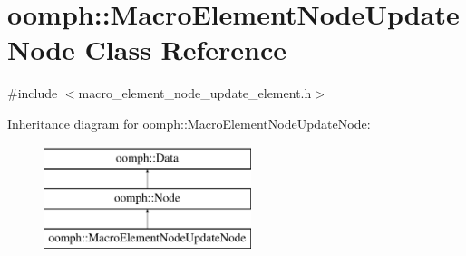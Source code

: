 \hypertarget{classoomph_1_1MacroElementNodeUpdateNode}{}\section{oomph\+:\+:Macro\+Element\+Node\+Update\+Node Class Reference}
\label{classoomph_1_1MacroElementNodeUpdateNode}


{\ttfamily \#include $<$macro\+\_\+element\+\_\+node\+\_\+update\+\_\+element.\+h$>$}

Inheritance diagram for oomph\+:\+:Macro\+Element\+Node\+Update\+Node\+:\begin{figure}[H]
\begin{center}
\leavevmode
\includegraphics[height=3.000000cm]{classoomph_1_1MacroElementNodeUpdateNode}
\end{center}
\end{figure}
